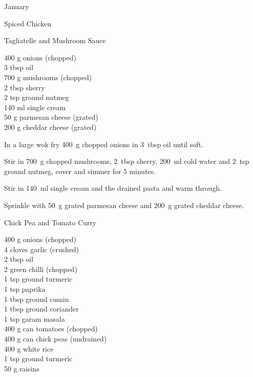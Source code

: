 \begin{menu}{January}
\begin{recipe}{2}{Spiced Chicken}
\begin{instructions}
    \end{instructions}
    \end{recipe}%
  
    \begin{recipe}{2}{Tagliatelle and Mushroom Sauce}%
		\begin{ingredients}
		400 g onions (chopped) \\
	3 tbsp oil  \\
	700 g mushrooms (chopped) \\
	2 tbsp sherry  \\
	2 tsp ground nutmeg  \\
	140 ml single cream  \\
	50 g parmesan cheese (grated) \\
	200 g cheddar cheese (grated) \\
	
		\end{ingredients}
	
	
    \begin{instructions}
    \item \item 
        In a large wok fry
        400~g chopped onions
        in
        3~tbsp  oil
        until soft.
      \item 
        Stir in
        700~g chopped mushrooms,
        2~tbsp  sherry,
        200~ml  cold water
        and
        2~tsp  ground nutmeg,
        cover and simmer for 5 minutes.
      \item 
        Stir in
        140~ml  single cream
        and the drained pasta
        and warm through.
      \item 
        Sprinkle with
        50~g grated parmesan cheese
        and
        200~g grated cheddar cheese.
      
    \end{instructions}
    \end{recipe}%
  
    \begin{recipe}{2}{Chick Pea and Tomato Curry}%
		\begin{ingredients}
		400 g onions (chopped) \\
	4 cloves garlic (crushed) \\
	2 tbsp oil  \\
	2  green chilli (chopped) \\
	1 tsp ground turmeric  \\
	1 tsp paprika  \\
	1 tbsp ground cumin  \\
	1 tbsp ground coriander  \\
	1 tsp garam masala  \\
	400 g can tomatoes (chopped) \\
	400 g can chick peas (undrained) \\
	400 g white rice  \\
	1 tsp ground turmeric  \\
	50 g raisins  \\
	

\end{ingredients}
\end{recipe}
\end{menu}
